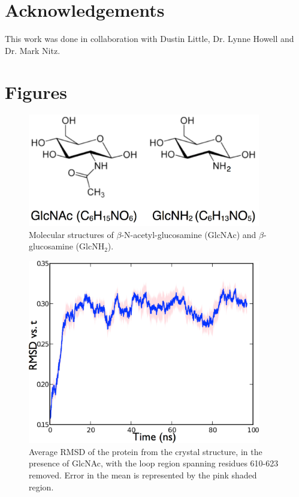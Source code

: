 \section{Acknowledgements}
This work was done in collaboration with Dustin Little, Dr. Lynne Howell and Dr. Mark Nitz.

\section{Figures}

\begin{figure}[htbp]
\centering
\includegraphics[width=4in]{figures/results4/sugar_structures.pdf}
\caption[Molecular structures of GlcNAc and GlcNH$_2$]{Molecular structures of $\beta$-N-acetyl-glucosamine (GlcNAc) and $\beta$-glucosamine (GlcNH$_2$).}
\label{fig:nag}
\end{figure}

\begin{figure}[htbp]
\centering
\includegraphics[width=4in]{figures/results4/rmsd.pdf}
\caption[RMSD vs. time of PgaB]{Average RMSD of the protein from the crystal structure, in the presence of GlcNAc, with the loop region spanning residues 610-623 removed. Error in the mean is represented by the pink shaded region.}
\label{fig:rmsd}
\end{figure}

